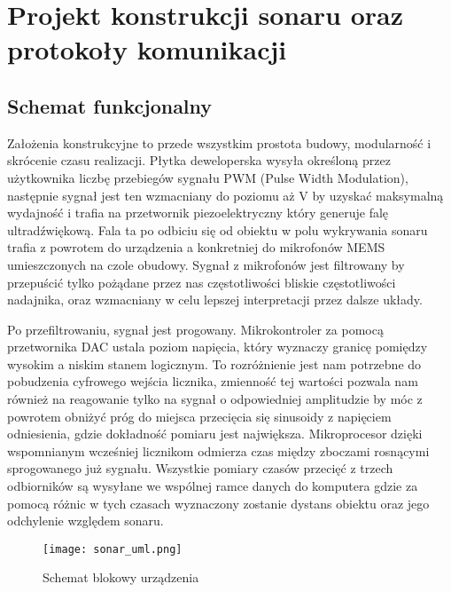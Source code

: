 \chapter[Projekt konstrukcji sonaru oraz protokoły komunikacji]{Projekt konstrukcji sonaru oraz protokoły komunikacji}

\label{chapter:konstrukcja}


\section{Schemat funkcjonalny}
Założenia konstrukcyjne to przede wszystkim prostota budowy, modularność i skrócenie czasu realizacji. 
Płytka deweloperska wysyła określoną przez użytkownika liczbę przebiegów sygnału PWM (Pulse Width Modulation), 
następnie sygnał jest ten wzmacniany 
do poziomu aż \unit[80]{V} by uzyskać maksymalną wydajność i trafia na przetwornik piezoelektryczny który generuje falę ultradźwiękową.
Fala ta po odbiciu się od obiektu w polu wykrywania sonaru trafia z powrotem do urządzenia a konkretniej do mikrofonów MEMS umieszczonych na czole obudowy.
Sygnał z mikrofonów jest filtrowany by przepuścić tylko pożądane przez nas częstotliwości bliskie częstotliwości nadajnika, 
oraz wzmacniany w celu lepszej interpretacji przez dalsze układy.

Po przefiltrowaniu, sygnał jest progowany. Mikrokontroler za pomocą przetwornika DAC ustala poziom napięcia, 
który wyznaczy granicę pomiędzy wysokim a niskim stanem logicznym. To rozróżnienie jest nam potrzebne do pobudzenia cyfrowego wejścia licznika, 
zmienność tej wartości pozwala nam również na reagowanie tylko na sygnał o odpowiedniej amplitudzie by móc z powrotem obniżyć próg 
do miejsca przecięcia się sinusoidy z napięciem odniesienia, gdzie dokładność pomiaru jest największa.
Mikroprocesor dzięki wspomnianym wcześniej licznikom odmierza czas między zboczami rosnącymi sprogowanego już sygnału.
Wszystkie pomiary czasów przecięć z trzech odbiorników są wysyłane we wspólnej ramce danych do komputera gdzie za pomocą 
różnic w tych czasach wyznaczony zostanie dystans obiektu oraz jego odchylenie względem sonaru.

\begin{figure}[ht!]
    \centering
    \texttt{[image: sonar\_uml.png]}
    \caption{Schemat blokowy urządzenia}
    \label{fig:uml}
\end{figure}

